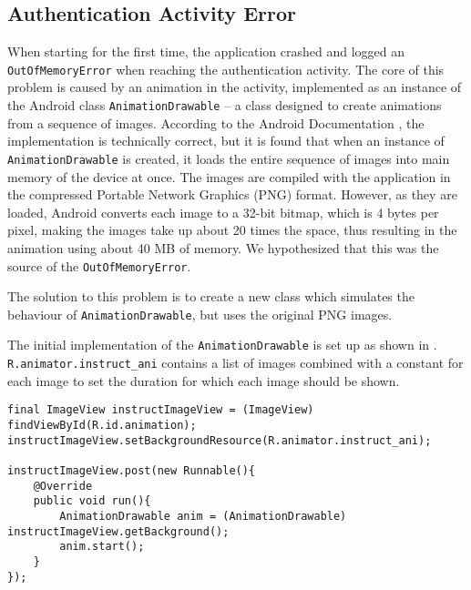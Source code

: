 \subsection{Authentication Activity Error}
When starting \launcher for the first time, the application crashed and logged an \lstinline{OutOfMemoryError} when reaching the authentication activity.
The core of this problem is caused by an animation in the activity, implemented as an instance of the Android class \lstinline{AnimationDrawable} -- a class designed to create animations from a sequence of images.
According to the Android Documentation \citet{androidreference}, the implementation is technically correct, but it is found that when an instance of \lstinline{AnimationDrawable} is created, it loads the entire sequence of images into main memory of the device at once.
The images are compiled with the application in the compressed Portable Network Graphics (PNG) format.
However, as they are loaded, Android converts each image to a 32-bit bitmap, which is 4 bytes per pixel, making the images take up about 20 times the space, thus resulting in the animation using about 40 MB of memory. 
We hypothesized that this was the source of the \lstinline{OutOfMemoryError}.

The solution to this problem is to create a new class which simulates the behaviour of \lstinline{AnimationDrawable}, but uses the original PNG images.

The initial implementation of the \lstinline{AnimationDrawable} is set up as shown in . 
\lstinline{R.animator.instruct_ani} contains a list of images combined with a constant for each image to set the duration for which each image should be shown.


\begin{lstlisting}[caption={The initial implementation, using \lstinline{AnimationDrawable}.},label={lst:animationDrawable}]
final ImageView instructImageView = (ImageView) findViewById(R.id.animation);
instructImageView.setBackgroundResource(R.animator.instruct_ani);

instructImageView.post(new Runnable(){
    @Override
    public void run(){
        AnimationDrawable anim = (AnimationDrawable) instructImageView.getBackground();
        anim.start();
    }
});
\end{lstlisting}

